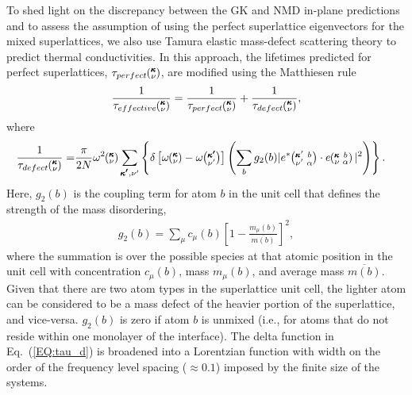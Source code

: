 \documentclass[aps,prb,preprint,preprintnumbers,amsmath,amssymb,floatfix,superscriptaddress]{revtex4}
\newcommand{\kvba}{\mspace{-4.0mu}\left(\mspace{-8.0mu}
\begin{smallmatrix} &\pmb{\kappa} &b \\ &\nu &\alpha\end{smallmatrix}
\mspace{-3.0mu}\right)}
\newcommand{\kvbap}{\mspace{-4.0mu}\left(\mspace{-8.0mu}
\begin{smallmatrix} &\pmb{\kappa}' &b \\ &\nu' &\alpha\end{smallmatrix}
\mspace{-3.0mu}\right)}
\newcommand{\kv}{\mspace{-4.0mu}\left(\mspace{-8.0mu}
\begin{smallmatrix}&\pmb{\kappa} \\&\nu\end{smallmatrix}
\mspace{-3.0mu}\right)}
\newcommand{\kvp}{\mspace{-4.0mu}\left(\mspace{-8.0mu}
\begin{smallmatrix}&\pmb{\kappa'} \\&\nu'\end{smallmatrix}
\mspace{-3.0mu}\right)}
\begin{document}
To shed light on the discrepancy between the GK and NMD in-plane predictions and to assess the assumption of using the perfect superlattice eigenvectors for the mixed superlattices, we also use Tamura elastic mass-defect scattering theory to predict thermal conductivities. \cite{tamura_isotope_1983,PhysRevB.87.140302,Luckyanova16112012} In this approach, the lifetimes predicted for perfect superlattices, $\tau_{perfect}\kv$, are modified using the Matthiesen rule 
\begin{equation}\label{EQ:tau_eff}
\begin{split}
\frac{1}{\tau_{effective}\kv} = \frac{1}{\tau_{perfect}\kv} +\frac{1}{\tau_{defect}\kv},
\end{split}
\end{equation}
where
\begin{equation}\label{EQ:tau_d}
\begin{split}
\frac{1}{\tau_{defect}\kv} = &\frac{\pi}{2N}\omega^2\kv \sum_{\pmb{\kappa'},\nu'} \left\{ \delta\left[ \omega\kv - \omega\kvp \right]
\left (\sum_{b} g_2(b) |e^*\kvbap \cdot e\kvba |^2 \right )\right \} .
\end{split}
\end{equation}
Here, $g_2(b)$ is the coupling term for atom $b$ in the unit cell that defines the strength of the mass disordering,
\begin{equation}\label{EQ:g(b)}
\begin{split}
g_2(b) = \sum_\mu c_{\mu}(b)\left[1-\frac{m_{\mu}(b)}{\overline{m(b)}}\right]^2, 
\end{split}
\end{equation}
where the summation is over the possible species at that atomic position in the unit cell with concentration $c_\mu(b)$, mass $m_\mu(b)$, and average mass $\overline{m(b)}$. Given that there are two atom types in the superlattice unit cell, the lighter atom can be considered to be a mass defect of the heavier portion of the superlattice, and vice-versa. $g_2(b)$ is zero if atom $b$ is unmixed (i.e., for atoms that do not reside within one monolayer of the interface). The delta function in Eq.~(\ref{EQ:tau_d}) is broadened into a Lorentzian function with width on the order of the frequency level spacing ($\approx 0.1$) imposed by the finite size of the systems.\cite{allen_thermal_1993}
\end{document}

